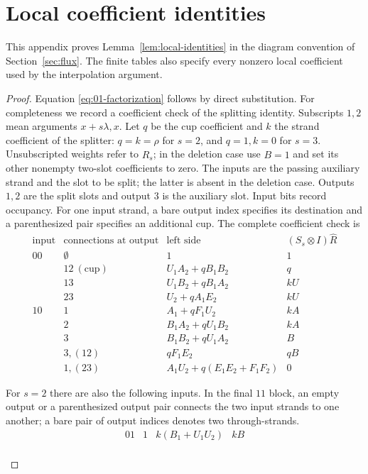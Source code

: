 \section{Local coefficient identities}\label{app:local-calculations}
This appendix proves Lemma~\ref{lem:local-identities} in the diagram convention of Section~\ref{sec:flux}. The finite tables also specify every nonzero local coefficient used by the interpolation argument.

\begin{proof}
Equation \eqref{eq:01-factorization} follows by direct substitution.
For completeness we record a coefficient check of the splitting
identity. Subscripts $1,2$ mean arguments $x+s\lambda,x$. Let $q$ be
the cup coefficient and $k$ the strand coefficient of the splitter:
$q=k=\rho$ for $s=2$, and $q=1,k=0$ for $s=3$. Unsubscripted weights
refer to $\widehat R_s$; in the deletion case use $B=1$ and set its
other nonempty two-slot coefficients to zero. The inputs are the
passing auxiliary strand and the slot to be split; the latter is
absent in the deletion case. Outputs $1,2$ are the split slots and
output $3$ is the auxiliary slot. Input bits record occupancy. For one
input strand, a bare output index specifies its destination and a
parenthesized pair specifies an additional cup. The complete coefficient
check is
\[
\begin{array}{c|c|c|c}
\text{input}&\text{connections at output}&\text{left side}&(S_s\otimes I)\widehat R\\\hline
00&\emptyset&1&1\\
&12\ (\text{cup})& U_1 A_2+q B_1 B_2 &q\\
&13&U_1 B_2+q B_1 A_2 & k U\\
&23&U_2+q A_1 E_2&k U\\\hline
10&1&A_1+q F_1 U_2 & k A\\
&2&B_1 A_2+q U_1 B_2 &k A\\
&3&B_1 B_2+q U_1 A_2 & B\\
&3,(12)&q F_1 E_2 &q B\\
&1,(23)&A_1 U_2+q(E_1 E_2+F_1 F_2)&0
\end{array}
\]
\begin{samepage}
For $s=2$ there are also the following inputs. In the final $11$ block,
an empty output or a parenthesized output pair connects the two input
strands to one another; a bare pair of output indices denotes two
through-strands.
\[
\begin{array}{c|c|c|c}
01&1&k(B_1+U_1 U_2)& k B\\

\end{array}\]
\end{samepage}
\end{proof}
